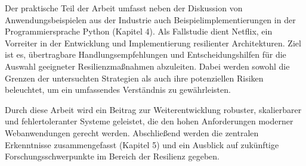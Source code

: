 Der praktische Teil der Arbeit umfasst neben der Diskussion von Anwendungsbeispielen aus der Industrie auch
Beispielimplementierungen in der Programmiersprache Python (Kapitel 4).
Als Fallstudie dient Netflix, ein Vorreiter in der Entwicklung und Implementierung resilienter Architekturen.
Ziel ist es, übertragbare Handlungsempfehlungen und Entscheidungshilfen für die Auswahl geeigneter Resilienzmaßnahmen
abzuleiten.
Dabei werden sowohl die Grenzen der untersuchten Strategien als auch ihre potenziellen Risiken beleuchtet,
um ein umfassendes Verständnis zu gewährleisten.


Durch diese Arbeit wird ein Beitrag zur Weiterentwicklung robuster, skalierbarer und fehlertoleranter Systeme geleistet,
die den hohen Anforderungen moderner Webanwendungen gerecht werden.
Abschließend werden die zentralen Erkenntnisse zusammengefasst (Kapitel 5) und ein Ausblick auf zukünftige
Forschungsschwerpunkte im Bereich der Resilienz gegeben.
